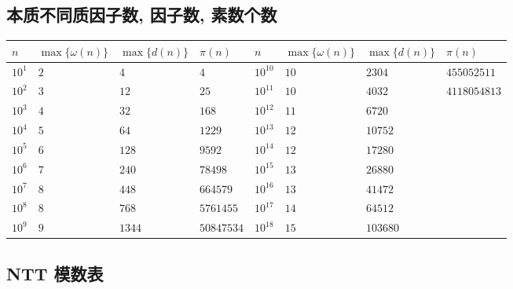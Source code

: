 \subsection{本质不同质因子数, 因子数, 素数个数}

\begin{tabular}{llll|llll}
    \hline
    \(n\)    & \(\max\{\omega(n)\}\) & \(\max\{d(n)\}\) & \(\pi(n)\)   & \(n\)       & \(\max\{\omega(n)\}\) & \(\max\{d(n)\}\) & \(\pi(n)\)     \\
    \hline
    \(10^1\) & \(2\)                 & \(4\)            & \(4\)        & \(10^{10}\) & \(10\)                & \(2304\)         & \(455052511\)  \\
    \(10^2\) & \(3\)                 & \(12\)           & \(25\)       & \(10^{11}\) & \(10\)                & \(4032\)         & \(4118054813\) \\
    \(10^3\) & \(4\)                 & \(32\)           & \(168\)      & \(10^{12}\) & \(11\)                & \(6720\)         &                \\
    \(10^4\) & \(5\)                 & \(64\)           & \(1229\)     & \(10^{13}\) & \(12\)                & \(10752\)        &                \\
    \(10^5\) & \(6\)                 & \(128\)          & \(9592\)     & \(10^{14}\) & \(12\)                & \(17280\)        &                \\
    \(10^6\) & \(7\)                 & \(240\)          & \(78498\)    & \(10^{15}\) & \(13\)                & \(26880\)        &                \\
    \(10^7\) & \(8\)                 & \(448\)          & \(664579\)   & \(10^{16}\) & \(13\)                & \(41472\)        &                \\
    \(10^8\) & \(8\)                 & \(768\)          & \(5761455\)  & \(10^{17}\) & \(14\)                & \(64512\)        &                \\
    \(10^9\) & \(9\)                 & \(1344\)         & \(50847534\) & \(10^{18}\) & \(15\)                & \(103680\)       &                \\
    \hline
\end{tabular}

\subsection{NTT 模数表}

